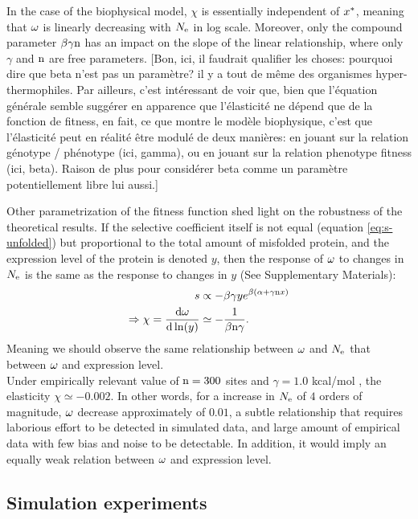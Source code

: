 \documentclass{article}
\begin{document}
	In the case of the biophysical model, $\chi$ is essentially independent of $x^{*}$, meaning that $\omega$ is linearly decreasing with $N_{\mathrm{e}}$ in log scale.
	Moreover, only the compound parameter $\beta \gamma \text{n}$ has an impact on the slope of the linear relationship, where only $\gamma$ and $\text{n}$ are free parameters. [Bon, ici, il faudrait qualifier les choses: pourquoi dire que beta n'est pas un paramètre? il y a tout de même des organismes hyper-thermophiles. Par ailleurs, c'est intéressant de voir que, bien que l'équation générale semble suggérer en apparence que l'élasticité ne dépend que de la fonction de fitness, en fait, ce que montre le modèle biophysique, c'est que l'élasticité peut en réalité être modulé de deux manières: en jouant sur la relation génotype / phénotype (ici, gamma), ou en jouant sur la relation phenotype fitness (ici, beta). Raison de plus pour considérer beta comme un paramètre potentiellement libre lui aussi.]
	
	Other parametrization of the fitness function shed light on the robustness of the theoretical results.
	If the selective coefficient itself is not equal (equation \ref{eq:s-unfolded}) but proportional to the total amount of misfolded protein, and the expression level of the protein is denoted $y$, then the response of $\omega$ to changes in $N_{\mathrm{e}}$ is the same as the response to changes in $y$ (See Supplementary Materials):
	\begin{align}
	s & \propto - \beta \gamma y  e^{\beta(\alpha + \gamma \text{n} x)} \\
	\Rightarrow \chi = \frac{ \mathrm{d} \omega}{\mathrm{d} \ln (y)} & \simeq -\dfrac{1}{\beta \text{n} \gamma}.
	\end{align}
	Meaning we should observe the same relationship between $\omega$ and $N_{\mathrm{e}}$ that between $\omega$ and expression level.\\
	
	Under empirically relevant value of $\text{n}=300$ sites and $\gamma=1.0$ kcal/mol \cite{Zeldovich2007}, the elasticity $\chi \simeq -0.002$.
	In other words, for a increase in $N_{\mathrm{e}}$ of $4$ orders of magnitude, $\omega$ decrease approximately of $0.01$, a subtle relationship that requires laborious  effort to be detected in simulated data, and large amount of empirical data with few bias and noise to be detectable. In addition, it would imply an equally weak relation between $\omega$ and expression level.
	
	\subsection*{Simulation experiments}
	
\end{document}
